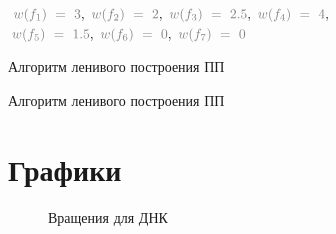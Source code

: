 \documentclass[utf8]{beamer}
\begin{document}
\begin{frame}
	\begin{exampleblock}{}
		\begin{center} 
				${\color{gray}w(f_1)\ =\ 3},\ {\color{gray}w(f_2)\ =\ 2},\
				{\color{gray}w(f_3)\ =\ 2.5},\ {\color{gray}w(f_4)\ =\ 4},$ 
				\\${\color{gray}w(f_5)\ =\ 1.5},\ {\color{gray}w(f_6)\ =\ 0},\
				{\color{gray}w(f_7)\ =\ 0}$
		\end{center}  
	\end{exampleblock}
	\begin{block}{Алгоритм ленивого построения ПП}
		\picLazyCFifteenth                                        
	\end{block}
\end{frame}

\begin{frame}
	\begin{block}{Алгоритм ленивого построения ПП}
		\picLazyCSixteenth                                        
	\end{block}
\end{frame}

\section{Графики}

\begin{frame}
	\begin{figure}[!h]
	    \caption{Вращения для ДНК}
	\end{figure}
\end{frame}
\end{document}
